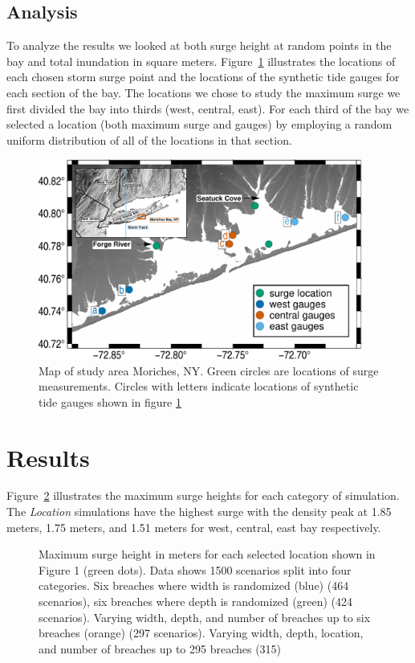 \documentclass{coastal_paper}
\begin{document}
\subsection{Analysis}
To analyze the results we looked at both surge height at random points in the bay and total inundation in square meters. Figure~\ref{fig:2} illustrates the locations of each chosen storm surge point and the locations of the synthetic tide gauges for each section of the bay. The locations we chose to study the maximum surge we first divided the bay into thirds (west, central, east). For each third of the bay we selected a location (both maximum surge and gauges) by employing a random uniform distribution of all of the locations in that section. 
\begin{figure}
    \centering
    \includegraphics[width=0.95\textwidth]{figures/fig2_v2.pdf}
    \caption{Map of study area Moriches, NY. Green circles are locations of surge measurements. Circles with letters indicate locations of synthetic tide gauges shown in figure \ref{fig:2}}
    \label{fig:2}
\end{figure}

\section{Results}
 Figure~\ref{fig:3} illustrates the maximum surge heights for each category of simulation. The \emph{Location} simulations have the highest surge with the density peak at 1.85 meters, 1.75 meters, and 1.51 meters for west, central, east bay respectively. 

\begin{figure}[ht]
    \centering
    \resizebox{\textwidth}{!}{%
            
        }
    \caption{Maximum surge height in meters for each selected location shown in Figure 1 (green dots). Data shows 1500 scenarios split into four categories. Six breaches where width is randomized (blue) (464 scenarios), six breaches where depth is randomized (green) (424 scenarios). Varying width, depth, and number of breaches up to six breaches (orange) (297 scenarios). Varying width, depth, location, and number of breaches up to 295 breaches (315)}
    \label{fig:3}
\end{figure}
\end{document}
